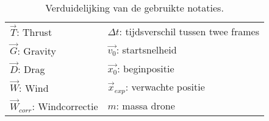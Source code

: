 \begin{table}[H]
	\centering
	\begin{tabular}{ l|l }
		\(\vec{T}\): Thrust & \(\Delta t\): tijdsverschil tussen twee frames\\
		\(\vec{G}\): Gravity & \(\vec{v_0}\): startsnelheid\\
		\(\vec{D}\): Drag & \(\vec{x_0}\): beginpositie\\
		\(\vec{W}\): Wind & \(\vec{x}_{exp}\): verwachte positie\\
		\(\vec{W}_{corr}\): Windcorrectie & \(m\): massa drone \\
	\end{tabular}
	\caption{\label{table: uitlegFormule}Verduidelijking van de gebruikte notaties.}
\end{table}